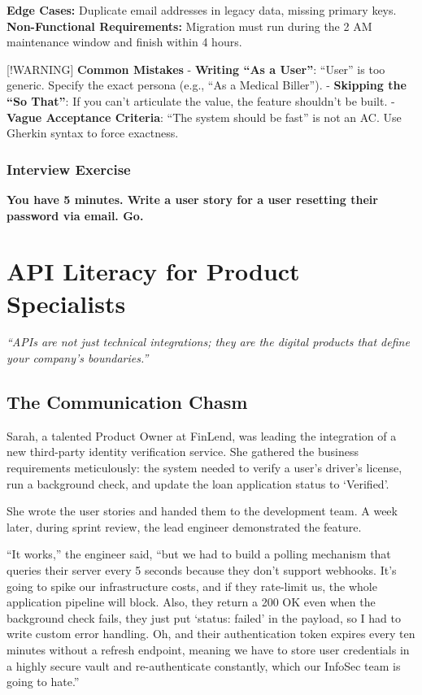 \documentclass[
  11pt,
  openany,
  oneside]{book}
\renewenvironment{quote}{\begin{customquote}}{\end{customquote}}
\begin{document}
\textbf{Edge Cases:} Duplicate email addresses in legacy data, missing
primary keys. \textbf{Non-Functional Requirements:} Migration must run
during the 2 AM maintenance window and finish within 4 hours.

\begin{quote}
{[}!WARNING{]} \textbf{Common Mistakes} - \textbf{Writing ``As a
User''}: ``User'' is too generic. Specify the exact persona (e.g., ``As
a Medical Biller''). - \textbf{Skipping the ``So That''}: If you can't
articulate the value, the feature shouldn't be built. - \textbf{Vague
Acceptance Criteria}: ``The system should be fast'' is not an AC. Use
Gherkin syntax to force exactness.
\end{quote}

\subsection{Interview Exercise}\label{interview-exercise}

\textbf{You have 5 minutes. Write a user story for a user resetting
their password via email. Go.}

\chapter{API Literacy for Product
Specialists}\label{api-literacy-for-product-specialists}

\begin{quote}
\emph{``APIs are not just technical integrations; they are the digital
products that define your company's boundaries.''}
\end{quote}

\section{The Communication Chasm}\label{the-communication-chasm}

Sarah, a talented Product Owner at FinLend, was leading the integration
of a new third-party identity verification service. She gathered the
business requirements meticulously: the system needed to verify a user's
driver's license, run a background check, and update the loan
application status to `Verified'.

She wrote the user stories and handed them to the development team. A
week later, during sprint review, the lead engineer demonstrated the
feature.

``It works,'' the engineer said, ``but we had to build a polling
mechanism that queries their server every 5 seconds because they don't
support webhooks. It's going to spike our infrastructure costs, and if
they rate-limit us, the whole application pipeline will block. Also,
they return a 200 OK even when the background check fails, they just put
`status: failed' in the payload, so I had to write custom error
handling. Oh, and their authentication token expires every ten minutes
without a refresh endpoint, meaning we have to store user credentials in
a highly secure vault and re-authenticate constantly, which our InfoSec
team is going to hate.''
\end{document}
